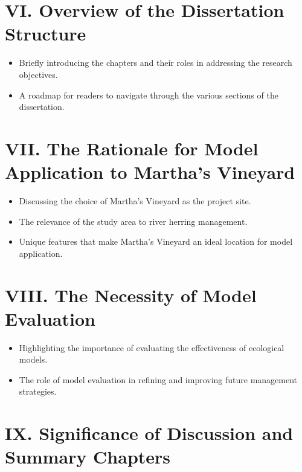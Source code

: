 \documentclass[
]{book}
\providecommand{\tightlist}{%
  \setlength{\itemsep}{0pt}\setlength{\parskip}{0pt}}
\begin{document}
\hypertarget{vi.-overview-of-the-dissertation-structure}{%
\section{VI. Overview of the Dissertation Structure}\label{vi.-overview-of-the-dissertation-structure}}

\begin{itemize}
\tightlist
\item
  Briefly introducing the chapters and their roles in addressing the research objectives.
\item
  A roadmap for readers to navigate through the various sections of the dissertation.
\end{itemize}

\hypertarget{vii.-the-rationale-for-model-application-to-marthas-vineyard}{%
\section{VII. The Rationale for Model Application to Martha's Vineyard}\label{vii.-the-rationale-for-model-application-to-marthas-vineyard}}

\begin{itemize}
\tightlist
\item
  Discussing the choice of Martha's Vineyard as the project site.
\item
  The relevance of the study area to river herring management.
\item
  Unique features that make Martha's Vineyard an ideal location for model application.
\end{itemize}

\hypertarget{viii.-the-necessity-of-model-evaluation}{%
\section{VIII. The Necessity of Model Evaluation}\label{viii.-the-necessity-of-model-evaluation}}

\begin{itemize}
\tightlist
\item
  Highlighting the importance of evaluating the effectiveness of ecological models.
\item
  The role of model evaluation in refining and improving future management strategies.
\end{itemize}

\hypertarget{ix.-significance-of-discussion-and-summary-chapters}{%
\section{IX. Significance of Discussion and Summary Chapters}\label{ix.-significance-of-discussion-and-summary-chapters}}
\end{document}
